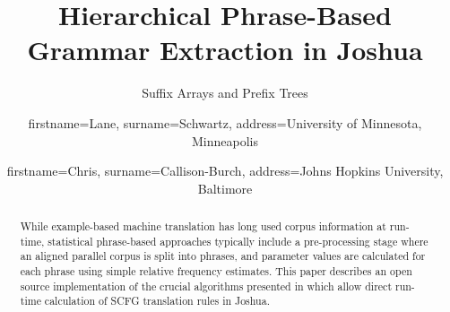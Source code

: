 \documentclass{pbml}
\begin{document}
% 

\title{Hierarchical Phrase-Based Grammar Extraction in Joshua}


\subtitle{Suffix Arrays and Prefix Trees}


\author{firstname=Lane, surname=Schwartz,
       address={University of Minnesota, Minneapolis}}

\author{firstname=Chris, surname=Callison-Burch,
       address={Johns Hopkins University, Baltimore}}

% 



\maketitle


% 

\begin{abstract}
While example-based machine translation has long used corpus information at run-time, statistical phrase-based approaches typically include a pre-processing stage where an aligned parallel corpus is split into phrases, and parameter values are calculated for each phrase using simple relative frequency estimates. This paper describes an open source implementation of the crucial algorithms presented in \cite{Lopez2008} which allow direct run-time calculation of SCFG translation rules in Joshua.
\end{abstract}
\end{document}
